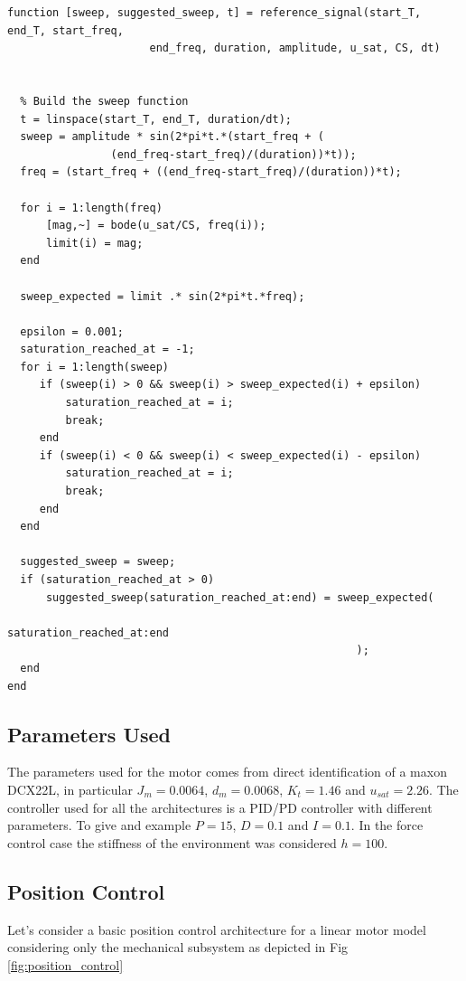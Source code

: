 \documentclass[a4paper,11pt]{article}
\begin{document}
\begin{lstlisting}[basicstyle=\small]
  function [sweep, suggested_sweep, t] = reference_signal(start_T, end_T, start_freq, 
                      end_freq, duration, amplitude, u_sat, CS, dt)


  % Build the sweep function
  t = linspace(start_T, end_T, duration/dt);
  sweep = amplitude * sin(2*pi*t.*(start_freq + (
                (end_freq-start_freq)/(duration))*t));
  freq = (start_freq + ((end_freq-start_freq)/(duration))*t);

  for i = 1:length(freq) 
      [mag,~] = bode(u_sat/CS, freq(i));
      limit(i) = mag;
  end

  sweep_expected = limit .* sin(2*pi*t.*freq);

  epsilon = 0.001;
  saturation_reached_at = -1;
  for i = 1:length(sweep)
     if (sweep(i) > 0 && sweep(i) > sweep_expected(i) + epsilon)
         saturation_reached_at = i;
         break;
     end
     if (sweep(i) < 0 && sweep(i) < sweep_expected(i) - epsilon)
         saturation_reached_at = i;
         break;
     end
  end
  
  suggested_sweep = sweep;
  if (saturation_reached_at > 0)
      suggested_sweep(saturation_reached_at:end) = sweep_expected(
                                                      saturation_reached_at:end
                                                      );
  end
end
\end{lstlisting}

\newpage

\subsection{Parameters Used}

\bigskip
The parameters used for the motor comes from direct identification of a maxon DCX22L, in particular $J_m = 0.0064$, $d_m = 0.0068$, $K_t = 1.46$ and $u_{sat} = 2.26$. The controller used for all the architectures is a PID/PD controller with different parameters. To give and example $P = 15$, $D = 0.1$ and $I = 0.1$. In the force control case the stiffness of the environment was considered $h = 100$.

\bigskip
\subsection{Position Control}
Let's consider a basic position control architecture for a linear motor model considering only the mechanical subsystem as depicted in Fig \ref{fig:position_control}
\end{document}
